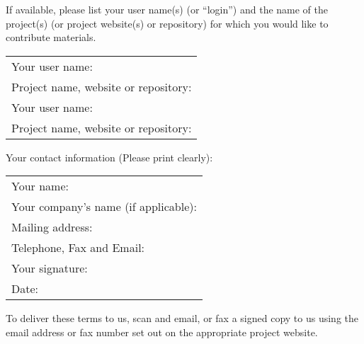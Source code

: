 If available, please list your user name(s) (or ``login'') and the name of
the project(s) (or project website(s) or repository) for which you would
like to contribute materials.

\begin{tabular}{l}
  Your user name:                       \\
  Project name, website or repository: \\
  Your user name:                       \\
  Project name, website or repository: \\
\end{tabular}

Your contact information (Please print clearly):

\begin{tabular}{l}
  Your name:                             \\
  Your company's name (if applicable):   \\
  Mailing address:                       \\
  Telephone, Fax and Email:              \\
  Your signature:                        \\
  Date:                                  \\
\end{tabular}


To deliver these terms to us, scan and email, or fax a signed copy to us
using the  email address or fax number set out on
the appropriate project website.



